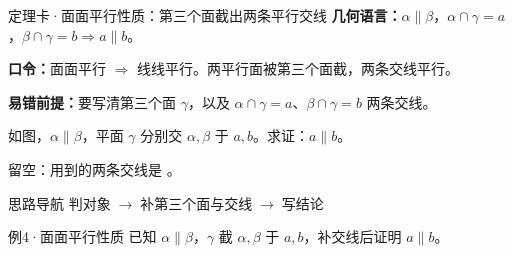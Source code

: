 \documentclass{exam-zh}
\begin{document}
\begin{eduSolutionBox}{定理卡·面面平行性质：第三个面截出两条平行交线}
  \begingroup
  \setlength{\parskip}{2.5mm}
\textbf{几何语言：}$\alpha\parallel\beta$，$\alpha\cap\gamma=a$，$\beta\cap\gamma=b\Rightarrow a\parallel b$。\par
\textbf{口令：}面面平行 $\Rightarrow$ 线线平行。两平行面被第三个面截，两条交线平行。\par
\textbf{易错前提：}要写清第三个面 $\gamma$，以及 $\alpha\cap\gamma=a$、$\beta\cap\gamma=b$ 两条交线。\par
  \endgroup
\end{eduSolutionBox}




\begin{eduProblemBlock}[例4·面面平行性质]
\noindent
\begin{minipage}[t]{\dimexpr\linewidth-70mm-6mm\relax}
\vspace{0pt}
如图，$\alpha\parallel\beta$，平面 $\gamma$ 分别交 $\alpha,\beta$ 于 $a,b$。求证：$a\parallel b$。
\par\noindent 留空：用到的两条交线是 \underline{\hspace{20mm}}。

\end{minipage}\hfill
\begin{diagramcoltikz}{70mm}{两平行平面 α、β 被第三个面 γ 截出交线 a、b。}
}
\end{diagramcoltikz}
\end{eduProblemBlock}





\begin{eduAuxItem}{思路导航}
判对象$\;\to\;$补第三个面与交线$\;\to\;$写结论\end{eduAuxItem}




\begin{eduSubQuestionItem}{例4·面面平行性质}
已知 $\alpha\parallel\beta$，$\gamma$ 截 $\alpha,\beta$ 于 $a,b$，补交线后证明 $a\parallel b$。\end{eduSubQuestionItem}
\end{document}
